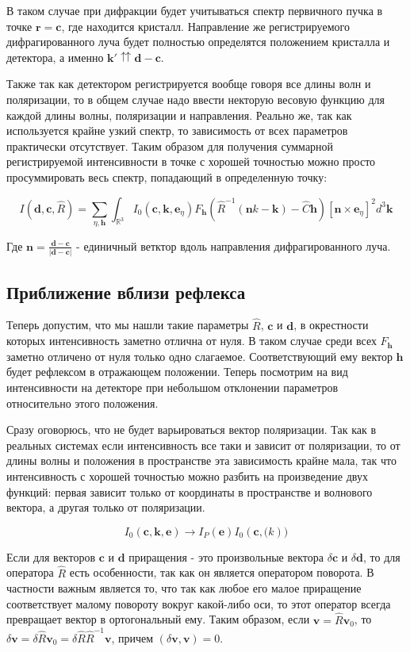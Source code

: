 \documentclass[12pt]{article}
\begin{document}
В таком случае при дифракции будет учитываться спектр первичного
пучка в точке $\pmb{r} = \pmb{c}$, где находится кристалл.
Направление же регистрируемого дифрагированного луча будет полностью
определятся положением кристалла и детектора, а именно
$\pmb{k}' \upuparrows \pmb{d} - \pmb{c}$.

Также так как детектором регистрируется вообще говоря все
длины волн и поляризации, то в общем случае надо ввести некторую весовую функцию
для каждой длины волны, поляризации и направления. Реально же, так как
используется крайне узкий спектр, то зависимость от всех параметров
практически отсутствует. Таким образом для получения суммарной регистрируемой
интенсивности в точке с хорошей точностью можно просто просуммировать
весь спектр, попадающий в определенную точку:

\[ I(\pmb{d}, \pmb{c}, \hat{R}) = \sum_{\eta,\pmb{h}}
    \int_{\mathbb{R}^3} I_0(\pmb{c}, \pmb{k}, \pmb{e}_\eta)
    F_{\pmb{h}}\left(\hat{R}^{-1}\left(\pmb{n} k - \pmb{k}\right) - \hat{C} \pmb{h}\right)
\left[\pmb{n} \times \pmb{e}_\eta\right]^2 d^3 \pmb{k}\]

Где $\pmb{n} = \frac{\pmb{d} - \pmb{c}}{|\pmb{d} - \pmb{c}|}$ - единичный ветктор вдоль направления
дифрагированного луча.

\subsection*{Приближение вблизи рефлекса}

Теперь допустим, что мы нашли такие параметры $\hat{R}$, $\pmb{c}$ и $\pmb{d}$,
в окрестности которых интенсивность заметно отлична от нуля. В таком случае
среди всех $F_{\pmb{h}}$ заметно отличено от нуля только одно слагаемое.
Соответствующий ему вектор $\pmb{h}$ будет рефлексом в отражающем положении.
Теперь посмотрим на вид интенсивности на детекторе при небольшом отклонении
параметров относительно этого положения.

Сразу оговорюсь, что не будет варьироваться вектор поляризации. Так как
в реальных системах если интенсивность все таки и зависит от поляризации,
то от длины волны и положения в пространстве эта зависимость крайне мала, так что
интенсивность с хорошей точностью можно разбить на произведение двух функций:
первая зависит только от координаты в пространстве и волнового вектора, а другая только
от поляризации.

\[ I_0(\pmb{c}, \pmb{k}, \pmb{e}) \rightarrow I_P(\pmb{e}) I_0(\pmb{c}, \pmb(k)) \]

Если для векторов $\pmb{c}$ и $\pmb{d}$ приращения - это произвольные вектора
$\delta \pmb{c}$ и $\delta \pmb{d}$, то для оператора $\hat{R}$ есть особенности,
так как он является оператором поворота. В частности важным является то, что
так как любое его малое приращение соответствует малому повороту вокруг
какой-либо оси, то этот оператор всегда превращает вектор в ортогональный ему.
Таким образом, если $\pmb{v} = \hat{R} \pmb{v}_0$, то
$\delta \pmb{v} = \delta \hat{R} \pmb{v}_0 = \delta \hat{R} \hat{R}^{-1} \pmb{v}$,
причем $(\delta \pmb{v}, \pmb{v}) = 0$.
\end{document}
